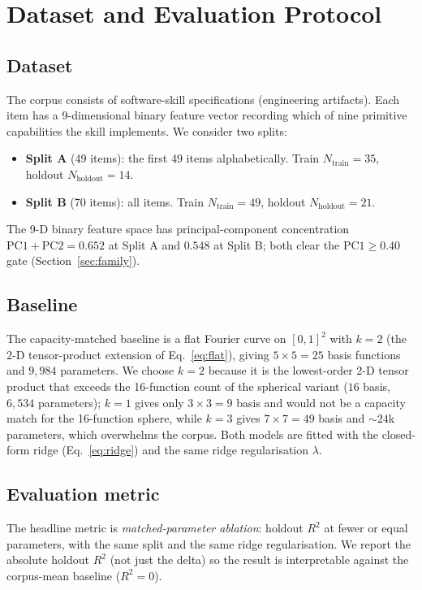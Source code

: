 \documentclass[11pt,a4paper]{article}
\begin{document}
\section{Dataset and Evaluation Protocol}
\label{sec:dataset}

\subsection{Dataset}
The corpus consists of software-skill specifications (engineering artifacts). Each item has a 9-dimensional binary feature vector recording which of nine primitive capabilities the skill implements. We consider two splits:
\begin{itemize}
\item \textbf{Split A} (49 items): the first 49 items alphabetically. Train $N_{\mathrm{train}}=35$, holdout $N_{\mathrm{holdout}}=14$.
\item \textbf{Split B} (70 items): all items. Train $N_{\mathrm{train}}=49$, holdout $N_{\mathrm{holdout}}=21$.
\end{itemize}

The 9-D binary feature space has principal-component concentration $\mathrm{PC1}+\mathrm{PC2} = 0.652$ at Split A and $0.548$ at Split B; both clear the $\mathrm{PC1} \geq 0.40$ gate (Section~\ref{sec:family}).

\subsection{Baseline}
The capacity-matched baseline is a flat Fourier curve on $[0,1]^2$ with $k=2$ (the 2-D tensor-product extension of Eq.~\ref{eq:flat}), giving $5 \times 5 = 25$ basis functions and $9{,}984$ parameters. We choose $k=2$ because it is the lowest-order 2-D tensor product that exceeds the 16-function count of the spherical variant ($16$ basis, $6{,}534$ parameters); $k=1$ gives only $3 \times 3 = 9$ basis and would not be a capacity match for the 16-function sphere, while $k=3$ gives $7 \times 7 = 49$ basis and $\sim 24$k parameters, which overwhelms the corpus. Both models are fitted with the closed-form ridge (Eq.~\ref{eq:ridge}) and the same ridge regularisation $\lambda$.

\subsection{Evaluation metric}
The headline metric is \emph{matched-parameter ablation}: holdout $R^2$ at fewer or equal parameters, with the same split and the same ridge regularisation. We report the absolute holdout $R^2$ (not just the delta) so the result is interpretable against the corpus-mean baseline ($R^2 = 0$).
\end{document}
